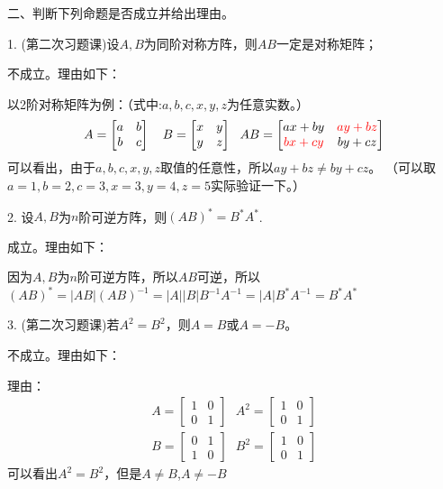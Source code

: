 \documentclass{article}
\begin{document}
二、判断下列命题是否成立并给出理由。

1. \textcolor[rgb]{0.50,0.00,0.00}{(第二次习题课)}设$A,B$为同阶对称方阵，则$AB$一定是对称矩阵；

\begin{jie}
不成立。理由如下：

以2阶对称矩阵为例：（式中:$a,b,c,x,y,z$为任意实数。）
\begin{equation*}
A=\begin{bmatrix}
  a & b \\
  b & c
\end{bmatrix}~~~B=
\begin{bmatrix}
  x & y \\
  y & z
\end{bmatrix}~~AB=
\begin{bmatrix}
  ax+by & \textcolor[rgb]{1.00,0.00,0.00}{ay+bz}\\
  \textcolor[rgb]{1.00,0.00,0.00}{bx+cy} & by+cz
\end{bmatrix}
\end{equation*}
可以看出，由于$a,b,c,x,y,z$取值的任意性，所以$ay+bz\neq by+cz$。 （可以取$a=1,b=2,c=3,x=3,y=4,z=5$实际验证一下。）
\end{jie}

2. 设$A,B$为$n$阶可逆方阵，则$(AB)^{*}=B^{*}A^{*}$.

\begin{jie}
成立。理由如下：

因为$A,B$为$n$阶可逆方阵，所以$AB$可逆，所以$(AB)^{*}=|AB|(AB)^{-1}=|A||B|B^{-1}A^{-1}=|A|B^{*}A^{-1}=B^{*}A^{*}$
\end{jie}

3. \textcolor[rgb]{0.50,0.00,0.00}{(第二次习题课)}若$A^{2}=B^{2}$，则$A=B$或$A=-B$。

\begin{jie}
不成立。理由如下：

理由：
\begin{align*}
 A=\begin{bmatrix}
  1 & 0\\
  0 & 1
   \end{bmatrix}~~~
 A^{2}=\begin{bmatrix}
         1 & 0\\
         0 & 1
       \end{bmatrix}\\
 B=\begin{bmatrix}
  0 & 1\\
  1 & 0
   \end{bmatrix}~~~
 B^{2}=\begin{bmatrix}
         1 & 0\\
         0 & 1
       \end{bmatrix}
\end{align*}
可以看出$A^{2}=B^{2}$，但是$A\neq B$,$A\neq -B$
\end{jie}
\end{document}
